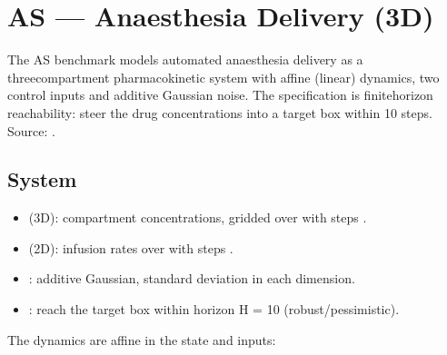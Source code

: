 \documentclass[a4paper,10pt,english]{sphinxmanual}
\begin{document}
\sphinxstepscope


\section{AS — Anaesthesia Delivery (3D)}
\label{\detokenize{benchmarks/AS:as-anaesthesia-delivery-3d}}\label{\detokenize{benchmarks/AS::doc}}
\sphinxAtStartPar
The AS benchmark models automated anaesthesia delivery as a three\sphinxhyphen{}compartment
pharmacokinetic system with affine (linear) dynamics, two control inputs and additive
Gaussian noise. The specification is finite\sphinxhyphen{}horizon reachability: steer the drug
concentrations into a target box within 10 steps. Source:
.


\subsection{System}
\label{\detokenize{benchmarks/AS:system}}\begin{itemize}
\item {} 
\sphinxAtStartPar
{} (3D): compartment concentrations, gridded over
 with steps .

\item {} 
\sphinxAtStartPar
{} (2D): infusion rates over  with steps .

\item {} 
\sphinxAtStartPar
{}: additive Gaussian, standard deviation  in each dimension.

\item {} 
\sphinxAtStartPar
{}: reach the target box  within horizon
H = 10 (robust/pessimistic).

\end{itemize}

\sphinxAtStartPar
The dynamics are affine in the state and inputs:
\end{document}
